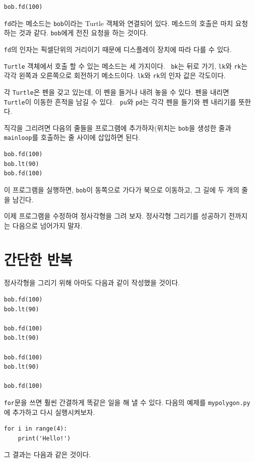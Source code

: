 \documentclass[10pt]{book}
\begin{document}
\begin{verbatim}
bob.fd(100)
\end{verbatim}
%
{\tt fd}라는 메소드는 {\tt bob}이라는 Turtle 객체와 연결되어 있다.
메소드의 호출은 마치 요청하는 것과 같다. {\tt bob}에게 전진 요청을 하는
것이다.

{\tt fd}의 인자는 픽셀단위의 거리이기 때문에 디스플레이 장치에 따라 다를 수 있다. 

\texttt{Turtle} 객체에서 호출 할 수 있는 메소드는 세 가지이다.  {\tt
  bk}는 뒤로 가기, {\tt lk}와 {\tt rk}는 각각 왼쪽과 오른쪽으로
회전하기 메소드이다. {\tt lk}와 {\tt rk}의 인자 값은 각도이다.

각 \texttt{Turtle}은 펜을 갖고 있는데, 이 펜을 들거나 내려 놓을 수
있다.  펜을 내리면 \texttt{Turtle}이 이동한 흔적을 남길 수 있다.  {\tt
  pu}와 {\tt pd}는 각각 펜을 들기와 펜 내리기를 뜻한다.

직각을 그리려면 다음의 줄들을 프로그램에 추가하자(위치는 {\tt bob}을 생성한 줄과  \verb"mainloop"를 호출하는 줄 사이에 삽입하면 된다. 

\begin{verbatim}
bob.fd(100)
bob.lt(90)
bob.fd(100)
\end{verbatim}
%
이 프로그램을 실행하면, {\tt bob}이 동쪽으로 가다가 북으로 이동하고, 그
길에 두 개의 줄을 남긴다.

이제 프로그램을 수정하여 정사각형을 그려 보자.  정사각형 그리기를
성공하기 전까지는 다음으로 넘어가지 말자.


\section{간단한 반복}
\label{repetition}

정사각형을 그리기 위해 아마도 다음과 같이 작성했을 것이다. 

\begin{verbatim}
bob.fd(100)
bob.lt(90)

bob.fd(100)
bob.lt(90)

bob.fd(100)
bob.lt(90)

bob.fd(100)
\end{verbatim}
%
{\tt for}문을 쓰면 훨씬 간결하게 똑같은 일을 해 낼 수 있다.  다음의
예제를 {\tt mypolygon.py}에 추가하고 다시 실행시켜보자.

\begin{verbatim}
for i in range(4):
    print('Hello!')
\end{verbatim}
%
그 결과는 다음과 같은 것이다.
\end{document}
